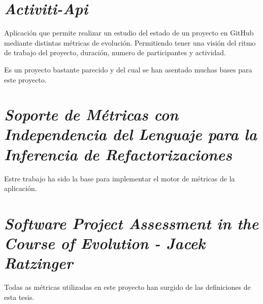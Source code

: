 
\section{\textit{Activiti-Api}\cite{rlp0019_software_2019}}
Aplicación que permite realizar un estudio del estado de un proyecto en GitHub mediante distintas métricas de evolución. Permitiendo tener una visión del ritmo de trabajo del proyecto, duración, numero de participantes y actividad.

Es un proyecto bastante parecido y del cual se han asentado muchas bases para este proyecto.
\section{\textit{Soporte de Métricas con Independencia del Lenguaje para la Inferencia de Refactorizaciones}\cite{rlp0019_software_2019}}
Estre trabajo ha sido la base para implementar el motor de métricas de la aplicación.
\section{\textit{Software Project Assessment in the Course of Evolution -  Jacek Ratzinger}\cite{rlp0019_software_2019}}
Todas as métricas utilizadas en este proyecto han surgido de las definiciones de esta tesis.